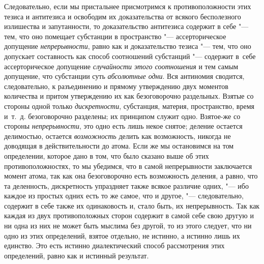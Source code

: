 Следовательно, если мы пристальнее присмотримся к противоположности этих тезиса
и антитезиса и освободим их доказательства от всякого бесполезного излишества и
запутанности, то доказательство антитезиса содержит в себе "--- тем, что оно
помещает субстанции в пространство "--- ассерторическое допущение
{\em непрерывности}, равно как и доказательство тезиса "--- тем, что оно
допускает составность как способ соотношений субстанций "--- содержит в~себе
ассерторическое допущение {\em случайности этого соотношения} и тем самым
допущение, что субстанции суть {\em абсолютные одни}. Вся антиномия сводится,
следовательно, к разъединению и прямому утверждению двух моментов количества и
притом утверждению их как безоговорочно раздельных. Взятые со стороны одной
только {\em дискретности}, субстанция, материя, пространство, время и~т.~д.
безоговорочно разделены; их принципом служит одно. Взятое-же со стороны
{\em непрерывности}, это одно есть лишь некое снятое; деление остается
делимостью, остается {\em возможность} делить как возможность, никогда не
доводящая в действительности до атома. Если же мы остановимся на том
определении, которое дано в том, что было сказано выше об этих
противоположностях, то мы убедимся, что в самой непрерывности заключается
момент атома, так как она безоговорочно есть возможность деления, а равно, что
та деленность, дискретность упраздняет также всякое различие одних, "--- ибо
каждое из простых одних есть то же самое, что и другое, "--- следовательно,
содержит в себе также их одинаковость и, стало быть, их непрерывность. Так как
каждая из двух противоположных сторон содержит в самой себе свою другую и ни
одна из них не может быть мыслима без другой, то из этого следует, что ни одно
из этих определений, взятое отдельно, не истинно, а истинно лишь их единство.
Это есть истинно диалектический способ рассмотрения этих определений, равно как
и истинный результат.

